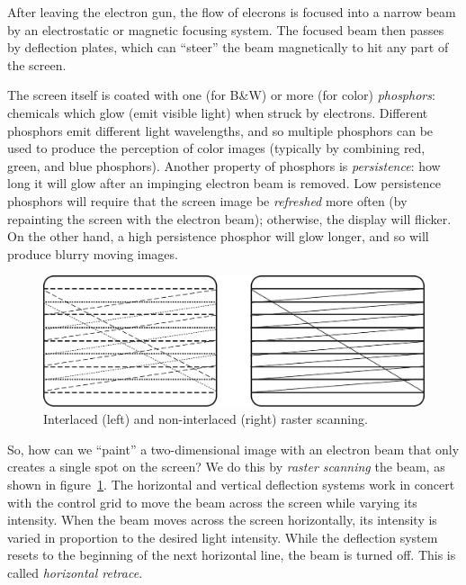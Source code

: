 After leaving the electron gun, the flow of elecrons is focused into a
narrow beam by an electrostatic or magnetic focusing system. The
focused beam then passes by deflection plates, which can ``steer'' the
beam magnetically to hit any part of the screen.

The screen itself is coated with one (for B\&W) or more (for color)
\emph{phosphors}: chemicals which glow (emit visible light) when struck
by electrons. Different phosphors emit different light wavelengths,
and so multiple phosphors can be used to produce the perception of
color images (typically by combining red, green, and blue
phosphors). Another property of phosphors is \emph{persistence}: how
long it will glow after an impinging electron beam is removed. Low
persistence phosphors will require that the screen image be
\emph{refreshed} more often (by repainting the screen with the
electron beam); otherwise, the display will flicker. On the other
hand, a high persistence phosphor will glow longer, and so will
produce blurry moving images.

\begin{figure}
\centerline{\includegraphics[width=\textwidth]{ch-physical/raster}}
\caption[Interlaced and non-interlaced raster 
  scanning]{Interlaced (left) and non-interlaced (right) raster
  scanning.\label{fg:raster}}
\end{figure}

So, how can we ``paint'' a two-dimensional image with an electron beam
that only creates a single spot on the screen? We do this by
\emph{raster scanning} the beam, as shown in
figure~\ref{fg:raster}. The horizontal and vertical deflection systems
work in concert with the control grid to move the beam across the
screen while varying its intensity. When the beam moves across the
screen horizontally, its intensity is varied in proportion to the
desired light intensity. While the deflection system resets to the
beginning of the next horizontal line, the beam is turned off. This is
called \emph{horizontal retrace}.

